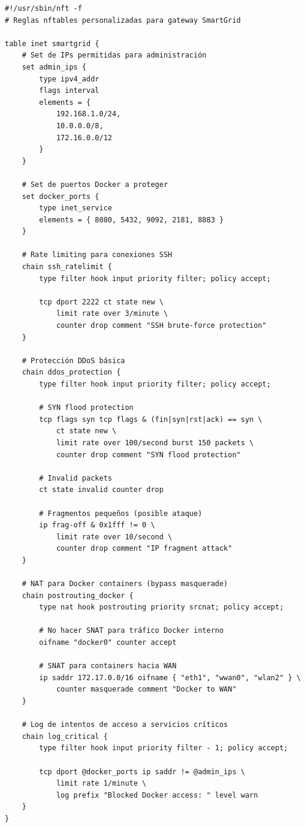 \begin{verbatim}
#!/usr/sbin/nft -f
# Reglas nftables personalizadas para gateway SmartGrid

table inet smartgrid {
    # Set de IPs permitidas para administración
    set admin_ips {
        type ipv4_addr
        flags interval
        elements = { 
            192.168.1.0/24,
            10.0.0.0/8,
            172.16.0.0/12
        }
    }
    
    # Set de puertos Docker a proteger
    set docker_ports {
        type inet_service
        elements = { 8080, 5432, 9092, 2181, 8883 }
    }
    
    # Rate limiting para conexiones SSH
    chain ssh_ratelimit {
        type filter hook input priority filter; policy accept;
        
        tcp dport 2222 ct state new \
            limit rate over 3/minute \
            counter drop comment "SSH brute-force protection"
    }
    
    # Protección DDoS básica
    chain ddos_protection {
        type filter hook input priority filter; policy accept;
        
        # SYN flood protection
        tcp flags syn tcp flags & (fin|syn|rst|ack) == syn \
            ct state new \
            limit rate over 100/second burst 150 packets \
            counter drop comment "SYN flood protection"
        
        # Invalid packets
        ct state invalid counter drop
        
        # Fragmentos pequeños (posible ataque)
        ip frag-off & 0x1fff != 0 \
            limit rate over 10/second \
            counter drop comment "IP fragment attack"
    }
    
    # NAT para Docker containers (bypass masquerade)
    chain postrouting_docker {
        type nat hook postrouting priority srcnat; policy accept;
        
        # No hacer SNAT para tráfico Docker interno
        oifname "docker0" counter accept
        
        # SNAT para containers hacia WAN
        ip saddr 172.17.0.0/16 oifname { "eth1", "wwan0", "wlan2" } \
            counter masquerade comment "Docker to WAN"
    }
    
    # Log de intentos de acceso a servicios críticos
    chain log_critical {
        type filter hook input priority filter - 1; policy accept;
        
        tcp dport @docker_ports ip saddr != @admin_ips \
            limit rate 1/minute \
            log prefix "Blocked Docker access: " level warn
    }
}
\end{verbatim}

